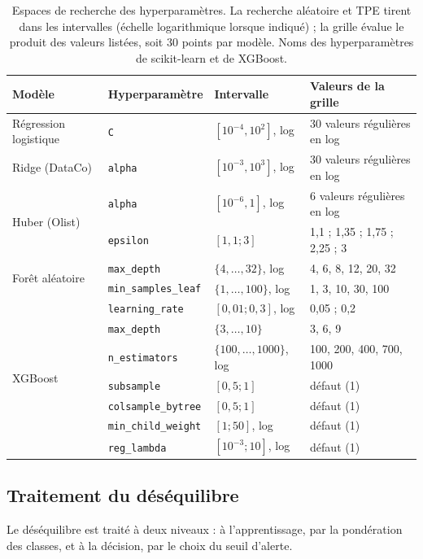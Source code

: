 \documentclass[11pt,a4paper]{article}
\theoremstyle{definition}
\begin{document}
\begin{table}[!htbp]
\centering
\footnotesize
\caption{Espaces de recherche des hyperparamètres. La recherche aléatoire et TPE tirent dans les intervalles (échelle logarithmique lorsque indiqué) ; la grille évalue le produit des valeurs listées, soit 30 points par modèle. Noms des hyperparamètres de scikit-learn et de XGBoost.}
\label{tab:espaces}
\begin{tabular}{@{}llll@{}}
\toprule
Modèle & Hyperparamètre & Intervalle & Valeurs de la grille \\
\midrule
Régression logistique & \texttt{C} & $[10^{-4}, 10^{2}]$, log & 30 valeurs régulières en log \\
Ridge (DataCo) & \texttt{alpha} & $[10^{-3}, 10^{3}]$, log & 30 valeurs régulières en log \\
\multirow{2}{*}{Huber (Olist)} & \texttt{alpha} & $[10^{-6}, 1]$, log & 6 valeurs régulières en log \\
 & \texttt{epsilon} & $[1{,}1 ; 3]$ & 1,1 ; 1,35 ; 1,75 ; 2,25 ; 3 \\
\midrule
\multirow{2}{*}{Forêt aléatoire} & \texttt{max\_depth} & $\{4, \dots, 32\}$, log & 4, 6, 8, 12, 20, 32 \\
 & \texttt{min\_samples\_leaf} & $\{1, \dots, 100\}$, log & 1, 3, 10, 30, 100 \\
\midrule
\multirow{7}{*}{XGBoost} & \texttt{learning\_rate} & $[0{,}01 ; 0{,}3]$, log & 0,05 ; 0,2 \\
 & \texttt{max\_depth} & $\{3, \dots, 10\}$ & 3, 6, 9 \\
 & \texttt{n\_estimators} & $\{100, \dots, 1000\}$, log & 100, 200, 400, 700, 1000 \\
 & \texttt{subsample} & $[0{,}5 ; 1]$ & défaut (1) \\
 & \texttt{colsample\_bytree} & $[0{,}5 ; 1]$ & défaut (1) \\
 & \texttt{min\_child\_weight} & $[1 ; 50]$, log & défaut (1) \\
 & \texttt{reg\_lambda} & $[10^{-3} ; 10]$, log & défaut (1) \\
\bottomrule
\end{tabular}
\end{table}

\subsection{Traitement du déséquilibre}
\label{sec:imbalance}

Le déséquilibre est traité à deux niveaux : à l'apprentissage, par la pondération des classes, et à la décision, par le choix du seuil d'alerte.
\end{document}
